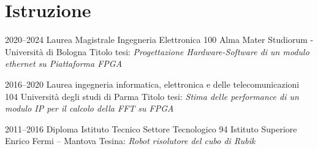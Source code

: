 \section{Istruzione}
\cventry
  {2020--2024}
  {Laurea Magistrale Ingegneria Elettronica}{}{}
  {100}
  {Alma Mater Studiorum - Università di Bologna
  \newline{}
  Titolo tesi: \textit{Progettazione Hardware-Software di un modulo ethernet su Piattaforma FPGA}}

\vspace{2mm}

\cventry
  {2016--2020}
  {Laurea ingegneria informatica, elettronica e delle telecomunicazioni}{}{}
  {104}
  {Università degli studi di Parma
  \newline{}
  Titolo tesi: \textit{Stima delle performance di un modulo IP per il calcolo della FFT su FPGA}}

\vspace{2mm}

\cventry
  {2011--2016}
  {Diploma Istituto Tecnico Settore Tecnologico}{}{}
  {94}
  {Istituto Superiore Enrico Fermi – Mantova
  \newline{}
  Tesina: \textit{Robot risolutore del cubo di Rubik}}

